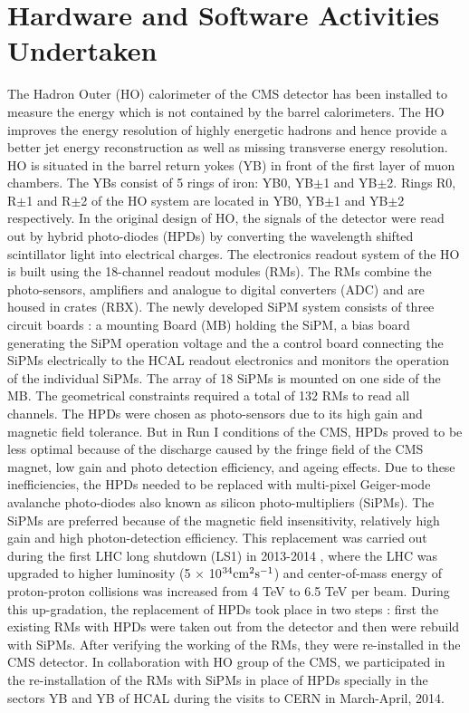 \chapter{Hardware and Software Activities Undertaken}
\label{chap:Hardware}

The Hadron Outer (HO) calorimeter of the CMS detector has been installed to measure the energy which is not contained by the barrel calorimeters. The HO improves the energy resolution of highly energetic hadrons and hence provide a better jet energy reconstruction as well as missing transverse energy resolution. HO is situated in the barrel return yokes (YB) in front of the first layer of muon chambers. The YBs consist of 5 rings of iron: YB0, YB$\pm$1 and YB$\pm$2. Rings R0, R$\pm$1 and R$\pm$2 of the HO system are located in YB0, YB$\pm$1 and YB$\pm$2 respectively. In the original design of HO, the signals of the detector were read out by hybrid photo-diodes (HPDs) by converting the wavelength shifted scintillator light into electrical charges. The electronics readout system of the HO is built using the 18-channel readout modules (RMs). The RMs combine the photo-sensors, amplifiers and analogue to digital converters (ADC) and are housed in crates (RBX). The newly developed SiPM system consists of three circuit boards : a mounting Board (MB) holding the SiPM, a bias board generating the SiPM operation voltage and the a control board connecting the SiPMs electrically to the HCAL readout electronics and monitors the operation of the individual SiPMs. The array of 18 SiPMs is mounted on one side of the MB. The geometrical constraints required a total of 132 RMs to read all channels. The HPDs were chosen as photo-sensors due to its high gain and magnetic field tolerance. But in Run I conditions of the CMS, HPDs proved to be less optimal because of the discharge caused by the fringe field of the CMS magnet, low gain and photo detection efficiency, and ageing effects. Due to these inefficiencies, the HPDs needed to be replaced with multi-pixel Geiger-mode avalanche photo-diodes also known as silicon photo-multipliers (SiPMs). The SiPMs are preferred because of the magnetic field insensitivity, relatively high gain and high photon-detection efficiency. This replacement was carried out during the first LHC long shutdown (LS1) in 2013-2014 \cite{Lutz:2012yoa}, where the LHC was upgraded to higher luminosity (5 $\times$ 10$^{34} {\rm cm}^2 {\rm s}^{-1}$) and center-of-mass energy of proton-proton collisions was increased from 4 TeV to 6.5 TeV per beam. During this up-gradation, the replacement of HPDs took place in two steps : first the existing RMs with HPDs were taken out from the detector and then were rebuild with SiPMs. After verifying the working of the RMs, they were re-installed in the CMS detector. In collaboration with HO group of the CMS, we participated in the re-installation of the RMs with SiPMs in place of HPDs specially in the sectors YB and YB of HCAL during the visits to CERN in March-April, 2014.

